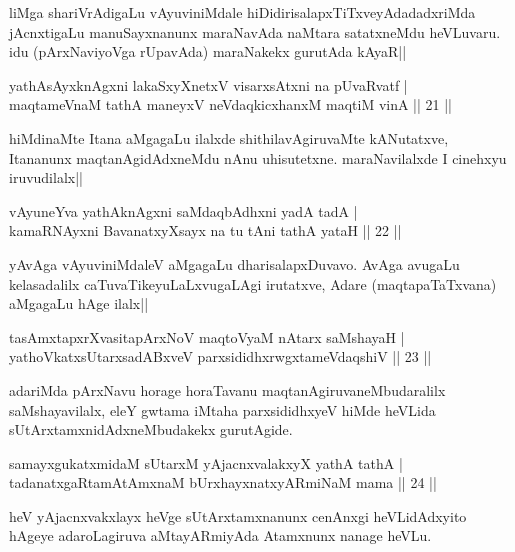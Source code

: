 \begin{artha}
liMga shariVrAdigaLu vAyuviniMdale hiDidirisalapxTiTxveyAdadadxriMda jAcnxtigaLu manuSayxnanunx maraNavAda naMtara satatxneMdu heVLuvaru. idu (pArxNaviyoVga rUpavAda) maraNakekx gurutAda kAyaR||
\end{artha}


\begin{shl}
yathA\s sAyxknAgxni lakaSxyXnetxV visarxsAtxni na pUvaRvatf |\\
maqtameVnaM tathA maneyxV neVdaqkicxhanxM maqtiM vinA \hfill || 21 ||
\end{shl}

\begin{artha}
hiMdinaMte Itana aMgagaLu ilalxde shithilavAgiruvaMte kANutatxve, Itananunx maqtanAgidAdxneMdu nAnu uhisutetxne. maraNavilalxde I cinehxyu iruvudilalx||
\end{artha}

\begin{shl}
vAyuneYva yathA\s knAgxni saMdaqbAdhxni yadA tadA |\\
kamaRNAyxni BavanatxyXsayx na tu tAni tathA yataH \hfill || 22 ||
\end{shl}

\begin{artha}
yAvAga vAyuviniMdaleV aMgagaLu dharisalapxDuvavo. AvAga avugaLu kelasadalilx caTuvaTikeyuLaLxvugaLAgi irutatxve, Adare (maqtapaTaTxvana) aMgagaLu hAge ilalx||
\end{artha}

\begin{shl}
tasAmxtapxrXvasitapArxNoV maqtoV\s yaM nAtarx saMshayaH |\\
yathoVkatxsUtarxsadABxveV parxsididhxrwgxtameVdaqshiV \hfill || 23 ||
\end{shl}

\begin{artha}%
adariMda pArxNavu horage horaTavanu maqtanAgiruvaneMbudaralilx saMshayavilalx, eleY gwtama iMtaha parxsididhxyeV hiMde heVLida sUtArxtamxnidAdxneMbudakekx gurutAgide.
\end{artha}

\begin{shl}
samayxgukatxmidaM sUtarxM yAjacnxvalakxyX yathA tathA |\\
tadanatxgaRtamAtAmxnaM bUrxhayxnatxyARmiNaM mama \hfill || 24 ||
\end{shl}

\begin{artha}
heV yAjacnxvakxlayx heVge sUtArxtamxnanunx cenAnxgi heVLidAdxyito hAgeye adaroLagiruva aMtayARmiyAda Atamxnunx nanage heVLu.
\end{artha}

